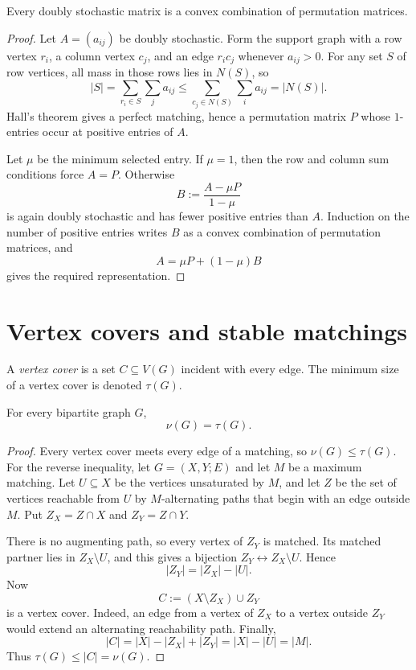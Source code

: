 \begin{notetheorem}
Every doubly stochastic matrix is a convex combination of permutation
matrices.
\end{notetheorem}
\begin{proof}
Let $A=(a_{ij})$ be doubly stochastic.  Form the support graph with a row
vertex $r_i$, a column vertex $c_j$, and an edge $r_ic_j$ whenever
$a_{ij}>0$.  For any set $S$ of row vertices, all mass in those rows lies in
$N(S)$, so
\[
  |S|=\sum_{r_i\in S}\sum_j a_{ij}
  \le\sum_{c_j\in N(S)}\sum_i a_{ij}=|N(S)|.
\]
Hall's theorem gives a perfect matching, hence a permutation matrix $P$ whose
$1$-entries occur at positive entries of $A$.

Let $\mu$ be the minimum selected entry.  If $\mu=1$, then the row and column
sum conditions force $A=P$.  Otherwise
\[
  B:=\frac{A-\mu P}{1-\mu}
\]
is again doubly stochastic and has fewer positive entries than $A$.  Induction
on the number of positive entries writes $B$ as a convex combination of
permutation matrices, and
\[
  A=\mu P+(1-\mu)B
\]
gives the required representation.
\end{proof}
\section{Vertex covers and stable matchings}

\begin{notedefinition}
A \emph{vertex cover} is a set $C\subseteq V(G)$ incident with every edge.
The minimum size of a vertex cover is denoted $\tau(G)$.
\end{notedefinition}

\begin{notetheorem}
For every bipartite graph $G$,
\[
  \nu(G)=\tau(G).
\]
\end{notetheorem}
\begin{proof}
Every vertex cover meets every edge of a matching, so $\nu(G)\le\tau(G)$.
For the reverse inequality, let $G=(X,Y;E)$ and let $M$ be a maximum matching.
Let $U\subseteq X$ be the vertices unsaturated by $M$, and let $Z$ be the set
of vertices reachable from $U$ by $M$-alternating paths that begin with an
edge outside $M$.  Put $Z_X=Z\cap X$ and $Z_Y=Z\cap Y$.

There is no augmenting path, so every vertex of $Z_Y$ is matched.  Its matched
partner lies in $Z_X\setminus U$, and this gives a bijection
$Z_Y\leftrightarrow Z_X\setminus U$.  Hence
\[
  |Z_Y|=|Z_X|-|U|.
\]
Now
\[
  C:=(X\setminus Z_X)\cup Z_Y
\]
is a vertex cover.  Indeed, an edge from a vertex of $Z_X$ to a vertex outside
$Z_Y$ would extend an alternating reachability path.  Finally,
\[
  |C|=|X|-|Z_X|+|Z_Y|=|X|-|U|=|M|.
\]
Thus $\tau(G)\le|C|=\nu(G)$.
\end{proof}

